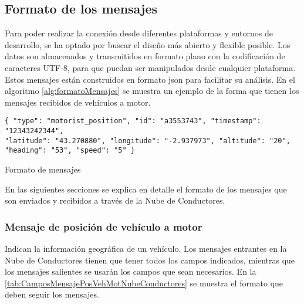 \subsection{Formato de los mensajes}\label{ssection:FormatoMensajesNC}
Para poder realizar la conexión desde diferentes plataformas y entornos de
desarrollo, se ha optado por buscar el diseño más abierto y flexible posible.
Los datos son almacenados y transmitidos en formato plano con la codificación
de caracteres \gls{UTF-8}, para que puedan ser manipulados desde cualquier
plataforma. Estos mensajes están construidos en formato \gls{json} para
facilitar su análisis. En el algoritmo \ref{alg:formatoMensajes} se muestra un
ejemplo de la forma que tienen los mensajes recibidos de vehículos a motor.

\begin{listing}
	\begin{minipage}{.4\textwidth}
		\begin{verbatim}
{ "type": "motorist_position", "id": "a3553743", "timestamp": "12343242344",
"latitude": "43.270880", "longitude": "-2.937973", "altitude": "20",
"heading": "53", "speed": "5" }
		\end{verbatim}
	\end{minipage}
	\caption{Formato de mensajes}\label{alg:formatoMensajes}
\end{listing}

En las siguientes secciones se explica en detalle el formato de los mensajes
que son enviados y recibidos a través de la Nube de Conductores.

\subsubsection{Mensaje de posición de vehículo a motor}\label{sssection:MensajePosVehMotor}
Indican la información geográfica de un vehículo. Los mensajes entrantes en
la Nube de Conductores tienen que tener todos los campos indicados, mientras
que los mensajes salientes se usarán los campos que sean necesarios. En la
\ref{tab:CamposMensajePosVehMotNubeConductores} se muestra el formato que deben
seguir los mensajes.

